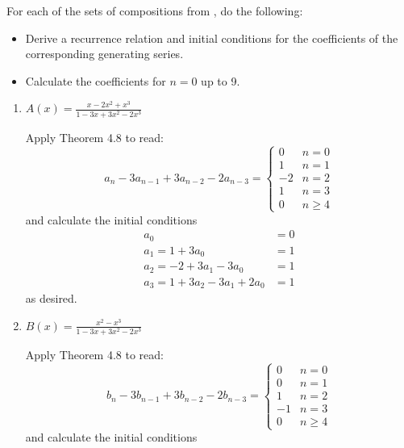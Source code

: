 \documentclass[class=math239,notes]{agony}
\begin{document}
\begin{xca}
  For each of the sets of compositions from , do the following:
  \begin{itemize}[nosep]
    \item Derive a recurrence relation and initial conditions for the coefficients of the corresponding generating series.
    \item Calculate the coefficients for $n=0$ up to 9.
  \end{itemize}
\end{xca}
\begin{enumerate}
  \item $A(x) = \frac{x-2x^2+x^3}{1-3x+3x^2-2x^3}$
        \begin{sol}
          Apply Theorem 4.8 to read:
          \[
            a_n - 3a_{n-1} + 3a_{n-2} - 2a_{n-3} = \begin{cases}
              0  & n = 0    \\
              1  & n = 1    \\
              -2 & n = 2    \\
              1  & n = 3    \\
              0  & n \geq 4
            \end{cases}
          \]
          and calculate the initial conditions
          \begin{align*}
            a_0                          & = 0 \\
            a_1 = 1 + 3a_0               & = 1 \\
            a_2 = -2 + 3a_1 - 3a_0       & = 1 \\
            a_3 = 1 + 3a_2 - 3a_1 + 2a_0 & = 1
          \end{align*}
          as desired.
        \end{sol}
  \item $B(x) = \frac{x^2-x^3}{1-3x+3x^2-2x^3}$
        \begin{sol}
          Apply Theorem 4.8 to read:
          \[
            b_n - 3b_{n-1} + 3b_{n-2} - 2b_{n-3} = \begin{cases}
              0  & n = 0    \\
              0  & n = 1    \\
              1  & n = 2    \\
              -1 & n = 3    \\
              0  & n \geq 4
            \end{cases}
          \]
          and calculate the initial conditions

\end{sol}
\end{enumerate}
\end{document}
